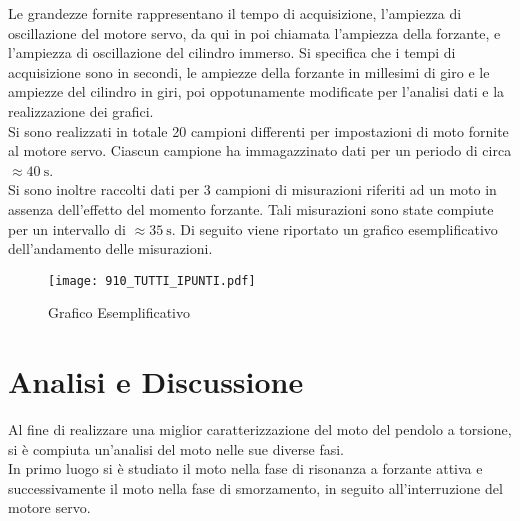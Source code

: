 \documentclass[a4paper,11pt,oneside]{article}
\begin{document}
Le grandezze fornite rappresentano il tempo di acquisizione, l'ampiezza di oscillazione del motore servo, da qui in poi chiamata l'ampiezza della forzante, e l'ampiezza di oscillazione del cilindro immerso. Si specifica che i tempi di acquisizione sono in secondi, le ampiezze della forzante in millesimi di giro e le ampiezze del cilindro in giri, poi oppotunamente modificate per l'analisi dati e la realizzazione dei grafici.\\
Si sono realizzati in totale 20 campioni differenti per impostazioni di moto fornite al  motore servo. Ciascun campione ha immagazzinato dati per un periodo di circa $\approx \SI{40}{\second}$.\\
Si sono inoltre raccolti dati per 3 campioni di misurazioni riferiti ad un moto in assenza dell'effetto del momento forzante. Tali misurazioni sono state compiute per un intervallo di $\approx  \SI{35}{\second}$.
Di seguito viene riportato un grafico esemplificativo dell'andamento delle misurazioni.


\begin{table}[h!]
    \centering
    \caption{Corrispondenza Campione-Frequenza}
    \label{tab:corrispondenza_campione_frequenza}
\end{table}

\begin{figure}[h!]
    \centering
    \label{fig:grafico_esempio}
    \caption{Grafico Esemplificativo}
    \texttt{[image: 910\_TUTTI\_IPUNTI.pdf]}
\end{figure}

\section{Analisi e Discussione}
Al fine di realizzare una miglior caratterizzazione del moto del pendolo a torsione, si è compiuta un'analisi del moto nelle sue diverse fasi.\\
In primo luogo si è studiato il moto nella fase di risonanza a forzante attiva e successivamente il moto nella fase di smorzamento, in seguito all'interruzione del motore servo.
\end{document}
